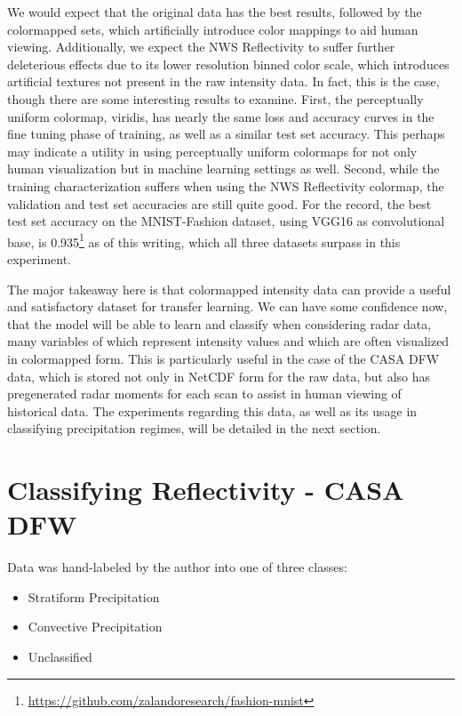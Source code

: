 We would expect that the original data has the best results, followed by the colormapped sets, which artificially introduce color mappings to aid human viewing.
Additionally, we expect the NWS Reflectivity to suffer further deleterious effects due to its lower resolution binned color scale, which introduces artificial textures not present in the raw intensity data.
In fact, this is the case, though there are some interesting results to examine.
First, the perceptually uniform colormap, viridis, has nearly the same loss and accuracy curves in the fine tuning phase of training, as well as a similar test set accuracy.
This perhaps may indicate a utility in using perceptually uniform colormaps for not only human visualization but in machine learning settings as well.
Second, while the training characterization suffers when using the NWS Reflectivity colormap, the validation and test set accuracies are still quite good.
For the record, the best test set accuracy on the MNIST-Fashion dataset, using VGG16 as
convolutional base, is 0.935\footnote{\url{https://github.com/zalandoresearch/fashion-mnist}} as of this writing, which all three datasets surpass in this experiment.

The major takeaway here is that colormapped intensity data can provide a useful and satisfactory dataset for transfer learning.
We can have some confidence now, that the model will be able to learn and classify when considering radar data, many variables of which represent intensity values and which are often visualized in colormapped form.
This is particularly useful in the case of the CASA DFW data, which is stored not only in NetCDF form for the raw data, but also has pregenerated radar moments for each scan to assist in human viewing of historical data.
The experiments regarding this data, as well as its usage in classifying precipitation regimes, will be detailed in the next section.

\section{Classifying Reflectivity - CASA DFW}
\label{sec:classifying_zhcasa}

Data was hand-labeled by the author into one of three classes:

\begin{itemize}
	\item Stratiform Precipitation
	\item Convective Precipitation
	\item Unclassified
\end{itemize}

